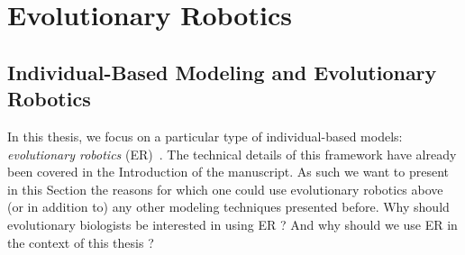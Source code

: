 \section{Evolutionary Robotics}     

    \subsection{Individual-Based Modeling and Evolutionary Robotics}

        In this thesis, we focus on a particular type of individual-based models: \emph{evolutionary robotics} (ER)~\parencite{Nolfi2000, Doncieux2015a}. The technical details of this framework have already been covered in the Introduction of the manuscript. As such we want to present in this Section the reasons for which one could use evolutionary robotics above (or in addition to) any other modeling techniques presented before. Why should evolutionary biologists be interested in using ER ? And why should we use ER in the context of this thesis ?




